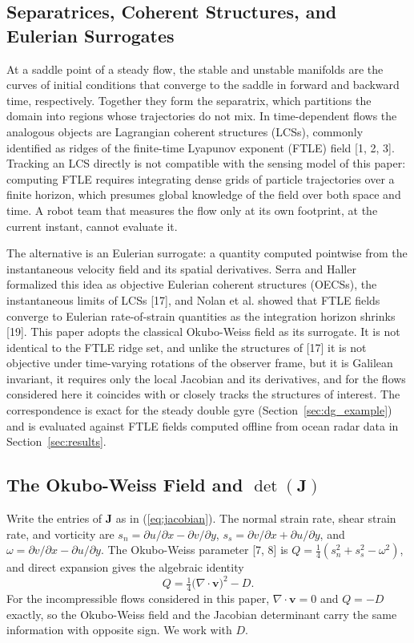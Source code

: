 \documentclass[lettersize,journal]{IEEEtran}
\begin{document}
\subsection{Separatrices, Coherent Structures, and Eulerian Surrogates}
\label{sec:separatrix}

At a saddle point of a steady flow, the stable and unstable manifolds are
the curves of initial conditions that converge to the saddle in forward
and backward time, respectively. Together they form the separatrix, which
partitions the domain into regions whose trajectories do not mix. In
time-dependent flows the analogous objects are Lagrangian coherent
structures (LCSs), commonly identified as ridges of the finite-time
Lyapunov exponent (FTLE) field [1, 2, 3]. Tracking an LCS directly is not
compatible with the sensing model of this paper: computing FTLE requires
integrating dense grids of particle trajectories over a finite horizon,
which presumes global knowledge of the field over both space and time. A
robot team that measures the flow only at its own footprint, at the
current instant, cannot evaluate it.

The alternative is an Eulerian surrogate: a quantity computed pointwise
from the instantaneous velocity field and its spatial derivatives. Serra
and Haller formalized this idea as objective Eulerian coherent structures
(OECSs), the instantaneous limits of LCSs [17], and Nolan et al. showed
that FTLE fields converge to Eulerian rate-of-strain quantities as the
integration horizon shrinks [19]. This paper adopts the classical
Okubo-Weiss field as its surrogate. It is not identical to the FTLE ridge
set, and unlike the structures of [17] it is not objective under
time-varying rotations of the observer frame, but it is Galilean
invariant, it requires only the local Jacobian and its derivatives, and
for the flows considered here it coincides with or closely tracks the
structures of interest. The correspondence is exact for the steady double
gyre (Section~\ref{sec:dg_example}) and is evaluated against FTLE fields
computed offline from ocean radar data in Section~\ref{sec:results}.

\subsection{The Okubo-Weiss Field and $\det(\mathbf{J})$}

Write the entries of $\mathbf{J}$ as in (\ref{eq:jacobian}). The normal
strain rate, shear strain rate, and vorticity are
$s_n = \partial u/\partial x - \partial v/\partial y$,
$s_s = \partial v/\partial x + \partial u/\partial y$, and
$\omega = \partial v/\partial x - \partial u/\partial y$. The Okubo-Weiss
parameter [7, 8] is $Q = \tfrac{1}{4}(s_n^2 + s_s^2 - \omega^2)$, and
direct expansion gives the algebraic identity
\begin{equation}
    Q = \tfrac{1}{4}\bigl(\nabla \cdot \mathbf{v}\bigr)^2 - D.
    \label{eq:okubo_weiss}
\end{equation}
For the incompressible flows considered in this paper,
$\nabla \cdot \mathbf{v} = 0$ and $Q = -D$ exactly, so the Okubo-Weiss
field and the Jacobian determinant carry the same information with
opposite sign. We work with $D$.
\end{document}
